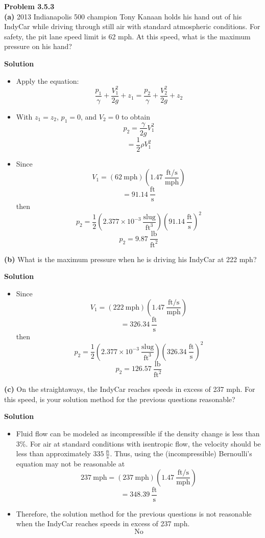 ﻿\documentclass[12pt]{article}
\begin{document}
\textbf{Problem 3.5.3}\\
\textbf{(a)} 2013 Indianapolis 500 champion Tony Kanaan holds his hand out of his IndyCar while driving through still air with standard atmospheric conditions. For safety, the pit lane speed limit is 62 mph. At this speed, what is the maximum pressure on his hand?

\textbf{Solution}
\begin{itemize}
    \item Apply the equation:
    \[\frac{p_1}{\gamma}+\frac{V_1^2}{2g}+z_1=\frac{p_2}{\gamma}+\frac{V_2^2}{2g}+z_2\]
    \item With $z_1=z_2$, $p_1=0$, and $V_2=0$ to obtain
    \[p_2=\frac{\gamma}{2g}V_1^2\]
    \[=\frac{1}{2}\rho V_1^2\]
    \item Since
    \[V_1=(62\ \mathrm{mph})\left(1.47\ \frac{\mathrm{ft/s}}{\mathrm{mph}}\right)\]
    \[=91.14\ \frac{\mathrm{ft}}{\mathrm{s}}\]
    then
    \[p_2=\frac{1}{2}\left(2.377\times10^{-3}\ \frac{\mathrm{slug}}{\mathrm{ft}^3}\right)\left(91.14\ \frac{\mathrm{ft}}{\mathrm{s}}\right)^2\]
    \[\boxed{p_2=9.87\ \frac{\mathrm{lb}}{\mathrm{ft}^2}}\]
\end{itemize}

\textbf{(b)} What is the maximum pressure when he is driving his IndyCar at 222 mph?

\textbf{Solution}
\begin{itemize}
    \item Since
    \[V_1=(222\ \mathrm{mph})\left(1.47\ \frac{\mathrm{ft/s}}{\mathrm{mph}}\right)\]
    \[=326.34\ \frac{\mathrm{ft}}{\mathrm{s}}\]
    then
    \[p_2=\frac{1}{2}\left(2.377\times10^{-3}\ \frac{\mathrm{slug}}{\mathrm{ft}^3}\right)\left(326.34\ \frac{\mathrm{ft}}{\mathrm{s}}\right)^2\]
    \[\boxed{p_2=126.57\ \frac{\mathrm{lb}}{\mathrm{ft}^2}}\]
\end{itemize}

\textbf{(c)} On the straightaways, the IndyCar reaches speeds in excess of 237 mph. For this speed, is your solution method for the previous questions reasonable?

\textbf{Solution}
\begin{itemize}
    \item Fluid flow can be modeled as incompressible if the density change is less than 3\%. For air at standard conditions with isentropic flow, the velocity should be less than approximately $335\ \frac{\mathrm{ft}}{\mathrm{s}}$. Thus, using the (incompressible) Bernoulli's equation may not be reasonable at
    \[237\ \mathrm{mph}=(237\ \mathrm{mph})\left(1.47\ \frac{\mathrm{ft/s}}{\mathrm{mph}}\right)\]
    \[=348.39\ \frac{\mathrm{ft}}{\mathrm{s}}\]
    \item Therefore, the solution method for the previous questions is not reasonable when the IndyCar reaches speeds in excess of 237 mph.
    \[\boxed{\text{No}}\]
\end{itemize}
\end{document}
